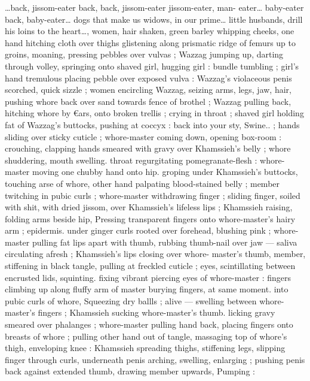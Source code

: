 {\gl}{\ldots}back, jissom-eater{\td} back, back, jissom-eater{\td} jissom-eater, man- 
eater{\ldots} baby-eater{\td} back, baby-eater{\ldots} dogs that make us widows, in 
our prime{\ldots} little husbands, drill his loins to the heart{\ldots}{\gr}, women, 
hair shaken, green barley whipping cheeks, one hand hitching cloth 
over thighs glistening along prismatic ridge of femurs up to groins, 
moaning, pressing pebbles over vulvas ; Wazzag jumping up, darting 
through volley, springing onto shaved girl, hugging girl : bundle 
tumbling ; girl's hand tremulous placing pebble over exposed vulva : 
Wazzag's violaceous penis scorched, quick sizzle ; women encircling 
Wazzag, seizing arms, legs, jaw, hair, pushing whore back over sand 
towards fence of brothel ; Wazzag pulling back, hitching whore by 
€ars, onto broken trellis ; crying in throat ; shaved girl holding fat of 
Wazzag's buttocks, pushing at coccyx : {\td} {\gl}{\td} back into your sty, 
Swine..{\gr} ; hands sliding over sticky cuticle ; whore-master coming 
down, opening box-room : crouching, clapping hands smeared with 
gravy over Khamssieh's belly ; whore shuddering, mouth swelling. 
throat regurgitating pomegranate-flesh : whore-master moving one 
chubby hand onto hip. groping under Khamssieh's buttocks, touching 
arse of whore, other hand palpating blood-stained belly ; member 
twitching in pubic curls ; whore-master withdrawing finger ; sliding 
finger, soiled with shit, with dried jissom, over Khamssieh's lifeless 
lips ; Khamssieh raising, folding arms beside hip, Pressing 
transparent fingers onto whore-master's hairy arm ; epidermis. 
under ginger curls rooted over forehead, blushing pink ; whore- 
master pulling fat lips apart with thumb, rubbing thumb-nail over jaw 
--- saliva circulating afresh ; Khamssieh's lips closing over whore- 
master's thumb, member, stiffening in black tangle, pulling at 
freckled cuticle ; eyes, scintillating between encrusted lids, squinting. 
fixing vibrant piercing eyes of whore-master : fingers climbing up 
along fluffy arm of master burying fingers, at same moment. into 
pubic curls of whore, Squeezing dry ballls ; alive --- swelling between 
whore-master's fingers ; Khamssieh sucking whore-master's thumb. 
licking gravy smeared over phalanges ; whore-master pulling hand 
back, placing fingers onto breasts of whore ; pulling other hand out 
of tangle, massaging top of whore's thigh, enveloping knee : 
Khamssieh spreading thighs, stiffening legs, slipping finger through 
curls, underneath penis arching, swelling, enlarging ; pushing penis 
back against extended thumb, drawing member upwards, Pumping : 
